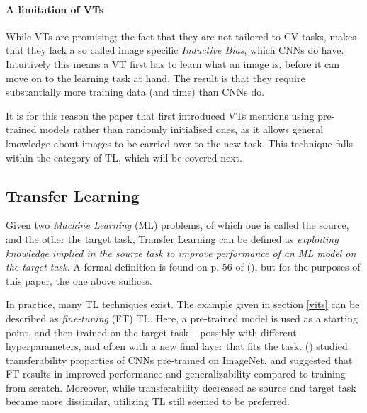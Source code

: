 \paragraph{A limitation of VTs}
While VTs are promising; the fact that they are not tailored to CV tasks, makes that they lack a so called image specific \textit{Inductive Bias}, which CNNs do have. Intuitively this means a VT first has to learn what an image is, before it can move on to the learning task at hand. The result is that they require substantially more training data (and time) than CNNs do. 

It is for this reason the paper that first introduced VTs \citep{dosovitskiy2020image} mentions using pre-trained models rather than randomly initialised ones, as it allows general knowledge about images to be carried over to the new task. This technique falls within the category of TL, which will be covered next.


\subsection{Transfer Learning}
Given two \textit{Machine Learning} (ML) problems, of which one is called the source, and the other the target task, Transfer Learning can be defined as \textit{exploiting knowledge implied in the source task to improve performance of an ML model on the target task}. A formal definition is found on p. 56 of \citeauthor{sabatelli2022contributions} (\citeyear{sabatelli2022contributions}), but for the purposes of this paper, the one above suffices.

In practice, many TL techniques exist. The example given in section \ref{vits} can be described as \textit{fine-tuning} (FT) TL. Here, a pre-trained model is used as a starting point, and then trained on the target task -- possibly with different hyperparameters, and often with a new final layer that fits the task. \citeauthor{yosinski2014transferable} (\citeyear{yosinski2014transferable}) studied transferability properties of CNNs pre-trained on ImageNet, and suggested that FT results in improved performance and generalizability compared to training from scratch. Moreover, while transferability decreased as source and target task became more dissimilar, utilizing TL still seemed to be preferred.

